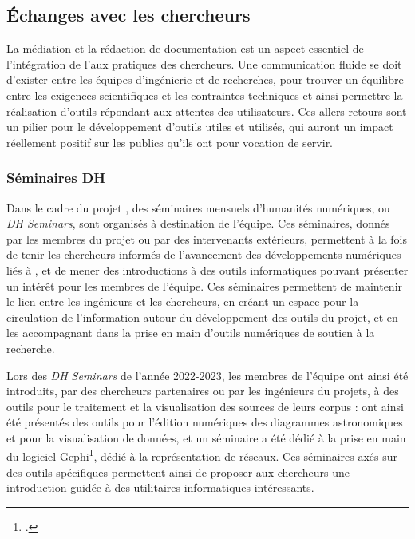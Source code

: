 
\subsection{Échanges avec les chercheurs}
	La médiation et la rédaction de documentation est un aspect essentiel de l'intégration de l'\ia aux pratiques des chercheurs. Une communication fluide se doit d'exister entre les équipes d'ingénierie et de recherches, pour trouver un équilibre entre les exigences scientifiques et les contraintes techniques et ainsi permettre la réalisation d'outils répondant aux attentes des utilisateurs. Ces allers-retours sont un pilier pour le développement d'outils utiles et utilisés, qui auront un impact réellement positif sur les publics qu'ils ont pour vocation de servir. 
	
    \subsubsection{Séminaires DH}
    Dans le cadre du projet \eida, des séminaires mensuels d'humanités numériques, ou \textit{DH Seminars}, sont organisés à destination de l'équipe. Ces séminaires, donnés par les membres du projet ou par des intervenants extérieurs, permettent à la fois de tenir les chercheurs informés de l'avancement des développements numériques liés à \eida, et de mener des introductions à des outils informatiques pouvant présenter un intérêt pour les membres de l'équipe. Ces séminaires permettent de maintenir le lien entre les ingénieurs et les chercheurs, en créant un espace pour la circulation de l'information autour du développement des outils du projet, et en les accompagnant dans la prise en main d'outils numériques de soutien à la recherche.
    
    Lors des \textit{DH Seminars} de l'année 2022-2023, les membres de l'équipe \eida ont ainsi été introduits, par des chercheurs partenaires ou par les ingénieurs du projets, à des outils pour le traitement et la visualisation des sources de leurs corpus : ont ainsi été présentés des outils pour l'édition numériques des diagrammes astronomiques et pour la visualisation de données, et un séminaire a été dédié à la prise en main du logiciel Gephi\footcite{Gephi}, dédié à la représentation de réseaux. Ces séminaires axés sur des outils spécifiques permettent ainsi de proposer aux chercheurs une introduction guidée à des utilitaires informatiques intéressants.
    
